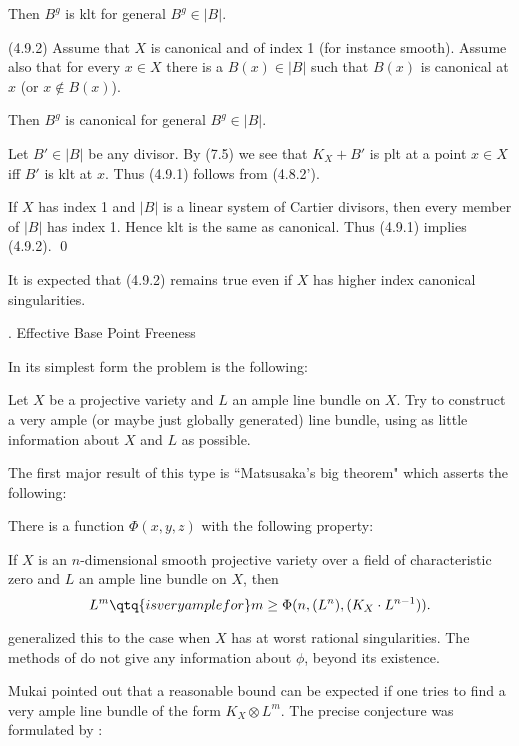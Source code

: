 Then $B^g$ is klt for   general 
$B^g\in |B|$.

(4.9.2) 
Assume that   $X$ is  canonical and of index 1 (for instance smooth).  Assume
also that for every
$x\in X$ there is a
$B(x)\in |B|$ such that $B(x)$ is
 canonical  at $x$ (or $x\not\in B(x)$). 

Then $B^g$ is canonical for   general 
$B^g\in |B|$.
\endproclaim

\demop  Let $B'\in |B|$ be any divisor. By (7.5)
we see that $K_X+B'$ is  plt at a point $x\in X$ iff
$B'$ is  klt at  $x$. Thus (4.9.1) follows from 
(4.8.2').

If $X$ has index 1 and $|B|$ is
a linear system of Cartier divisors, then every member of $|B|$ has index 1.
Hence klt is the same as canonical. Thus (4.9.1) implies (4.9.2).
\qed\enddemo








   It is expected that (4.9.2) remains true
even if $X$ has higher index canonical singularities.
\enddemo





 

. Effective Base Point Freeness
\endhead


In its simplest form the problem is the following:

  Let $X$ be a   projective variety and $L$ an ample
line bundle on $X$. Try to construct a very ample (or maybe just globally
generated) line bundle, using as little information about $X$ and $L$ as
possible.
\enddemo

The first major result of this type is ``Matsusaka's big theorem"
 which asserts the following:

 \cite{Matsusaka72}
There is a function
$\Phi(x,y,z)$ with the following property:

 If $X$ is an $n$-dimensional 
smooth projective variety over a field of
characteristic zero and
$L$   an ample line bundle on $X$, then 
$$
L^m\qtq{is very ample for} m\geq 
\Phi(n,(L^n),(K_X\cdot L^{n-1})). 
$$
\endproclaim

\cite{Matsusaka86}
generalized this to the case when $X$ has   at worst rational singularities.
The methods of  \cite{Matsusaka72,86} do not give
any information about $\phi$, beyond its existence. 

Mukai pointed out that a  reasonable bound can be expected if one tries to
find a very ample line bundle of the form $K_X\otimes L^m$. 
 The precise conjecture was formulated by \cite{Fujita87}:

